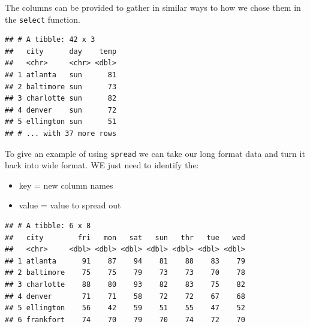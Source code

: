 \documentclass[
]{book}
\newenvironment{Shaded}{\begin{snugshade}}{\end{snugshade}}
\newcommand{\DataTypeTok}[1]{\textcolor[rgb]{0.13,0.29,0.53}{#1}}
\newcommand{\KeywordTok}[1]{\textcolor[rgb]{0.13,0.29,0.53}{\textbf{#1}}}
\newcommand{\NormalTok}[1]{#1}
\newcommand{\OperatorTok}[1]{\textcolor[rgb]{0.81,0.36,0.00}{\textbf{#1}}}
\newcommand{\StringTok}[1]{\textcolor[rgb]{0.31,0.60,0.02}{#1}}
\theoremstyle{definition}
\theoremstyle{definition}
\theoremstyle{definition}
\theoremstyle{remark}
\begin{document}
The columns can be provided to gather in similar ways to how we chose them in the \texttt{select} function.

\begin{Shaded}
\end{Shaded}

\begin{verbatim}
## # A tibble: 42 x 3
##   city      day    temp
##   <chr>     <chr> <dbl>
## 1 atlanta   sun      81
## 2 baltimore sun      73
## 3 charlotte sun      82
## 4 denver    sun      72
## 5 ellington sun      51
## # ... with 37 more rows
\end{verbatim}

To give an example of using \texttt{spread} we can take our long format data and turn it back into wide format. WE just need to identify the:

\begin{itemize}
\item
  key = new column names
\item
  value = value to spread out
\end{itemize}

\begin{Shaded}
\end{Shaded}

\begin{verbatim}
## # A tibble: 6 x 8
##   city        fri   mon   sat   sun   thr   tue   wed
##   <chr>     <dbl> <dbl> <dbl> <dbl> <dbl> <dbl> <dbl>
## 1 atlanta      91    87    94    81    88    83    79
## 2 baltimore    75    75    79    73    73    70    78
## 3 charlotte    88    80    93    82    83    75    82
## 4 denver       71    71    58    72    72    67    68
## 5 ellington    56    42    59    51    55    47    52
## 6 frankfort    74    70    79    70    74    72    70
\end{verbatim}
\end{document}
